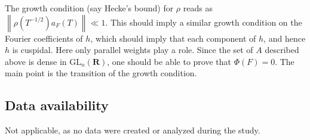\documentclass[12pt]{amsart}
\numberwithin{equation}{section}
\theoremstyle{plain}
\theoremstyle{definition}
\newcommand{\mf}{\mathbf}
\newcommand{\mrm}{\mathrm}
\newcommand{\GL}{\mrm{GL}}
\newcommand*{\norm}[1]{\left\lVert#1\right\rVert}
\begin{document}
The growth condition (say Hecke's bound) for $\rho$ reads as $\norm{\rho(T^{-1/2})a_F(T)} \ll 1$. This should imply a similar growth condition on the Fourier coefficients of $h$, which should imply that each component of $h$, and hence $h$ is cuspidal. Here only parallel weights play a role. Since the set of $A$ described above is dense in $\GL_{n}(\mf R)$, one should be able to prove that $\Phi (F)=0$. The main point is the transition of the growth condition.

\subsection*{Data availability}
Not applicable, as no data were created or analyzed during the study.

\printbibliography
\end{document}
